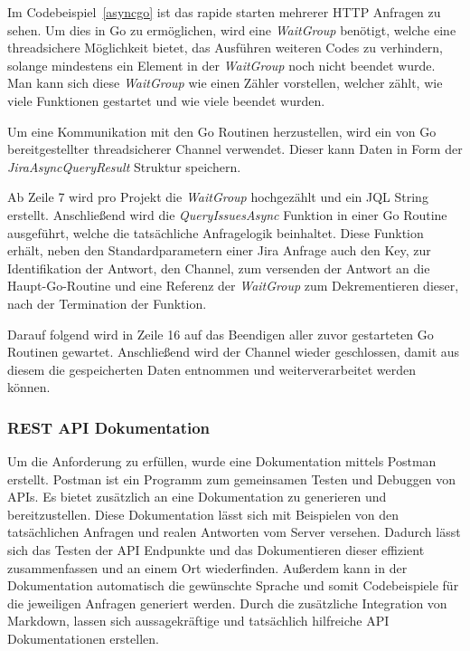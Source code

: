Im Codebeispiel~\ref{asyncgo} ist das rapide starten mehrerer HTTP Anfragen zu sehen. Um dies in
Go zu ermöglichen, wird eine \textit{WaitGroup} benötigt, welche eine \gls{threadsicher}e
Möglichkeit bietet, das Ausführen weiteren Codes zu verhindern, solange mindestens
ein Element in der \textit{WaitGroup} noch nicht beendet wurde. Man kann sich diese
\textit{WaitGroup} wie einen Zähler vorstellen, welcher zählt, wie viele Funktionen
gestartet und wie viele beendet wurden.

Um eine Kommunikation mit den Go Routinen herzustellen, wird ein von Go 
bereitgestellter \gls{threadsicher}er Channel verwendet. 
Dieser kann Daten in Form der \textit{JiraAsyncQueryResult} Struktur speichern. 

Ab Zeile 7 wird pro Projekt die \textit{WaitGroup} hochgezählt und ein \gls{JQL}
String erstellt. Anschließend wird die \textit{QueryIssuesAsync} Funktion in einer
Go Routine ausgeführt, welche die tatsächliche Anfragelogik beinhaltet. Diese Funktion
erhält, neben den Standardparametern einer Jira Anfrage auch den Key, zur Identifikation der Antwort,
den Channel, zum versenden der Antwort an die Haupt-Go-Routine und eine Referenz 
der \textit{WaitGroup} zum Dekrementieren dieser, nach der Termination der Funktion.

Darauf folgend wird in Zeile 16 auf das Beendigen aller zuvor gestarteten Go 
Routinen gewartet. Anschließend wird der Channel wieder geschlossen, damit aus diesem
die gespeicherten Daten entnommen und weiterverarbeitet werden können.

\subsubsection{REST API Dokumentation}
Um die Anforderung  zu erfüllen, wurde eine Dokumentation
mittels Postman erstellt. Postman ist ein Programm
zum gemeinsamen Testen und Debuggen von APIs. Es bietet zusätzlich an eine Dokumentation
zu generieren und bereitzustellen. Diese Dokumentation lässt sich mit Beispielen von 
den tatsächlichen Anfragen und realen Antworten vom Server versehen.
Dadurch lässt sich das Testen der API Endpunkte und das Dokumentieren
dieser effizient zusammenfassen und an einem Ort wiederfinden. Außerdem kann in der
Dokumentation automatisch die gewünschte Sprache und somit Codebeispiele für die
jeweiligen Anfragen generiert werden. Durch die zusätzliche Integration von Markdown, 
lassen sich aussagekräftige und tatsächlich hilfreiche API Dokumentationen erstellen.


